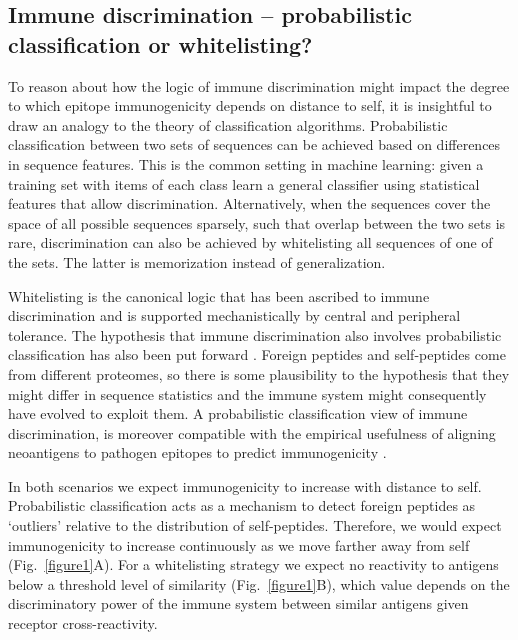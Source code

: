 \documentclass[superscriptaddress,twocolumn,pre]{revtex4}
\newcommand{\<}{\langle}
\renewcommand{\>}{\rangle}
\begin{document}
\subsection{Immune discrimination -- probabilistic classification or whitelisting?}

 To reason about how the logic of immune discrimination might impact the degree to which epitope immunogenicity depends on distance to self, it is insightful to draw an analogy to the theory of classification algorithms. Probabilistic classification between two sets of sequences can be achieved based on differences in sequence features. This is the common setting in machine learning: given a training set with items of each class learn a general classifier using statistical features that allow discrimination. Alternatively, when the sequences cover the space of all possible sequences sparsely, such that overlap between the two sets is rare, discrimination can also be achieved by whitelisting all sequences of one of the sets. The latter is memorization instead of generalization.

Whitelisting is the canonical logic that has been ascribed to immune discrimination and is supported mechanistically by central and peripheral tolerance. The hypothesis that immune discrimination also involves probabilistic classification has also been put forward \cite{Wortel2020}. Foreign peptides and self-peptides come from different proteomes, so there is some plausibility to the hypothesis that they might differ in sequence statistics and the immune system might consequently have evolved to exploit them. A probabilistic classification view of immune discrimination, is moreover compatible with the empirical usefulness of aligning neoantigens to pathogen epitopes to predict immunogenicity \cite{Luksza2017,Richman2019}.

In both scenarios we expect immunogenicity to increase with distance to self. Probabilistic classification acts as a mechanism to detect foreign peptides as ‘outliers’ relative to the distribution of self-peptides. Therefore, we would expect immunogenicity to increase continuously as we move farther away from self (Fig.~\ref{figure1}A). For a whitelisting strategy we expect no reactivity to antigens below a threshold level of similarity (Fig.~\ref{figure1}B), which value depends on the discriminatory power of the immune system between similar antigens given receptor cross-reactivity.
\end{document}
